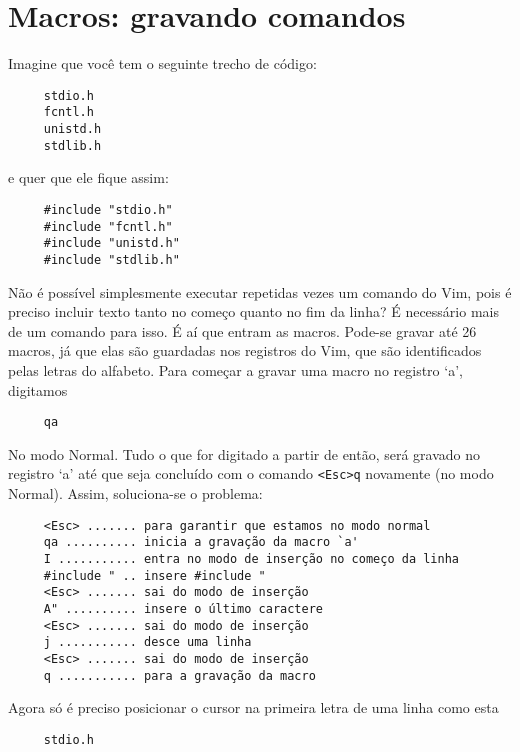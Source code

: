 \section{Macros: gravando comandos}\label{Macros: gravando comandos}

Imagine que você tem o seguinte trecho de código:

\begin{verbatim}
     stdio.h
     fcntl.h
     unistd.h
     stdlib.h
\end{verbatim}

e quer que ele fique assim:

\begin{verbatim}
     #include "stdio.h"
     #include "fcntl.h"
     #include "unistd.h"
     #include "stdlib.h"
\end{verbatim}

Não é possível simplesmente executar repetidas vezes um comando do Vim, pois
é preciso incluir texto tanto no começo quanto no fim da linha?  É necessário
mais de um comando para isso.  É aí que entram as macros. Pode-se gravar até 26
macros, já que elas são guardadas nos registros do Vim, que são identificados
pelas letras do alfabeto. Para começar a gravar uma macro no registro `a',
digitamos

\begin{verbatim}
     qa
\end{verbatim}

No modo Normal. Tudo o que for digitado a partir de então, será gravado no
registro `a' até que seja concluído com o comando
\verb|<Esc>q| novamente (no modo Normal). Assim,
soluciona-se o problema:

\begin{verbatim}
     <Esc> ....... para garantir que estamos no modo normal
     qa .......... inicia a gravação da macro `a'
     I ........... entra no modo de inserção no começo da linha
     #include " .. insere #include "
     <Esc> ....... sai do modo de inserção
     A" .......... insere o último caractere
     <Esc> ....... sai do modo de inserção
     j ........... desce uma linha
     <Esc> ....... sai do modo de inserção
     q ........... para a gravação da macro
\end{verbatim}

Agora só é preciso posicionar o cursor na primeira letra de uma linha como esta

\begin{verbatim}
     stdio.h
\end{verbatim}

